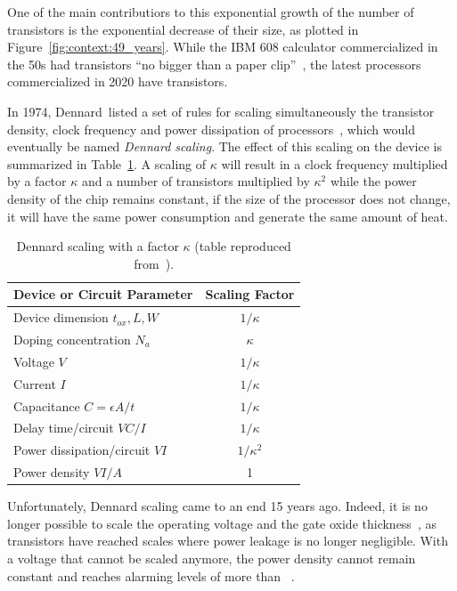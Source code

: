         One of the main contributiors to this exponential growth of the number of transistors is the exponential
        decrease of their size, as plotted in Figure~\ref{fig:context:49_years}. While the IBM 608 calculator
        commercialized in the 50s had transistors ``no bigger than a paper clip''~\cite{ibm608}, the latest processors
        commercialized in 2020 have  transistors.

        In 1974, Dennard~\etal listed a set of rules for scaling simultaneously the transistor density, clock frequency
        and power dissipation of processors~\cite{dennard}, which would eventually be named \emph{Dennard scaling}. The
        effect of this scaling on the device is summarized in Table~\ref{tab:dennard}. A scaling of \(\kappa\) will
        result in a clock frequency multiplied by a factor \(\kappa\) and a number of transistors multiplied by
        \(\kappa^2\) while the power density of the chip remains constant, \ie if the size of the processor does not
        change, it will have the same power consumption and generate the same amount of heat.

        \begin{table}[htpb]
            \centering
            \caption{Dennard scaling with a factor \(\kappa\) (table reproduced from~\cite[Table 1]{dennard}).}
            \label{tab:dennard}
            \begin{tabular}{l|c}
                Device or Circuit Parameter & Scaling Factor\\
                \hline
                Device dimension \(t_{ox}, L, W\) & \(1/\kappa\)\\
                Doping concentration \(N_a\) & \(\kappa\)\\
                Voltage \(V\) & \(1/\kappa\)\\
                Current \(I\) & \(1/\kappa\)\\
                Capacitance \(C=\epsilon A/t\) & \(1/\kappa\)\\
                Delay time/circuit \(VC/I\) & \(1/\kappa\)\\
                Power dissipation/circuit \(VI\) & \(1/\kappa^2\)\\
                Power density \(VI/A\) & 1\\
            \end{tabular}
        \end{table}

        Unfortunately, Dennard scaling came to an end 15 years ago. Indeed, it is no longer possible to scale the
        operating voltage and the gate oxide thickness~\cite{Bohr_2007}, as transistors have reached scales where power
        leakage is no longer negligible. With a voltage that cannot be scaled anymore, the power density cannot remain
        constant and reaches alarming levels of more than
        ~\cite{Hennessy_2019,Hennessy_youtube}.

